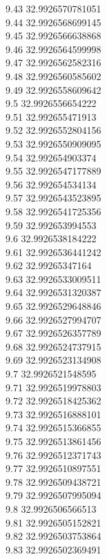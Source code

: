 {9.43	32.9926570781051\\
9.44	32.9926568699145\\
9.45	32.9926566638868\\
9.46	32.9926564599998\\
9.47	32.9926562582316\\
9.48	32.9926560585602\\
9.49	32.9926558609642\\
9.5	32.9926556654222\\
9.51	32.992655471913\\
9.52	32.9926552804156\\
9.53	32.9926550909095\\
9.54	32.992654903374\\
9.55	32.9926547177889\\
9.56	32.992654534134\\
9.57	32.9926543523895\\
9.58	32.9926541725356\\
9.59	32.992653994553\\
9.6	32.9926538184222\\
9.61	32.9926536441242\\
9.62	32.99265347164\\
9.63	32.9926533009511\\
9.64	32.9926531320387\\
9.65	32.9926529648846\\
9.66	32.9926527994707\\
9.67	32.9926526357789\\
9.68	32.9926524737915\\
9.69	32.9926523134908\\
9.7	32.9926521548595\\
9.71	32.9926519978803\\
9.72	32.9926518425362\\
9.73	32.9926516888101\\
9.74	32.9926515366855\\
9.75	32.9926513861456\\
9.76	32.9926512371743\\
9.77	32.9926510897551\\
9.78	32.9926509438721\\
9.79	32.9926507995094\\
9.8	32.9926506566513\\
9.81	32.9926505152821\\
9.82	32.9926503753864\\
9.83	32.9926502369491\\
}
